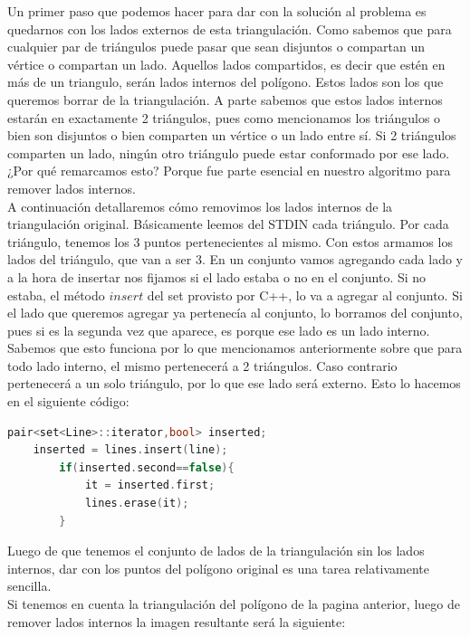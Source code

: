 \documentclass[a4paper]{article}
\begin{document}
Un primer paso que podemos hacer para dar con la solución al problema es quedarnos con los lados externos de esta triangulación. Como sabemos que para cualquier par de triángulos puede pasar que sean disjuntos o compartan un vértice o compartan un lado. Aquellos lados compartidos, es decir que estén en más de un triangulo, serán lados internos del polígono. Estos lados son los que queremos borrar de la triangulación. A parte sabemos que estos lados internos estarán en exactamente 2 triángulos, pues como mencionamos los triángulos o bien son disjuntos o bien comparten un vértice o un lado entre sí. Si 2 triángulos comparten un lado, ningún otro triángulo puede estar conformado por ese lado. ¿Por qué remarcamos esto? Porque fue parte esencial en nuestro algoritmo para remover lados internos.\\

A continuación detallaremos cómo removimos los lados internos de la triangulación original.
Básicamente leemos del STDIN cada triángulo.
Por cada triángulo, tenemos los 3 puntos pertenecientes al mismo. Con estos armamos los lados del triángulo, que van a ser 3.
En un conjunto vamos agregando cada lado y a la hora de insertar nos fijamos si el lado estaba o no en el conjunto.
Si no estaba, el método $insert$ del set provisto por C++, lo va a agregar al conjunto. Si el lado que queremos agregar ya pertenecía al conjunto, lo borramos del conjunto, pues si es la segunda vez que aparece, es porque ese lado es un lado interno.
Sabemos que esto funciona por lo que mencionamos anteriormente sobre que para todo lado interno, el mismo pertenecerá a 2 triángulos. Caso contrario pertenecerá a un solo triángulo, por lo que ese lado será externo.
Esto lo hacemos en el siguiente código:\\

\begin{lstlisting}[language=c++]
	pair<set<Line>::iterator,bool> inserted;
	inserted = lines.insert(line);
		if(inserted.second==false){
			it = inserted.first;
			lines.erase(it);
		}
\end{lstlisting}

Luego de que tenemos el conjunto de lados de la triangulación sin los lados internos, dar con los puntos del polígono original es una tarea relativamente sencilla.\\

Si tenemos en cuenta la triangulación del polígono de la pagina anterior, luego de remover lados internos la imagen resultante será la siguiente:
\end{document}
